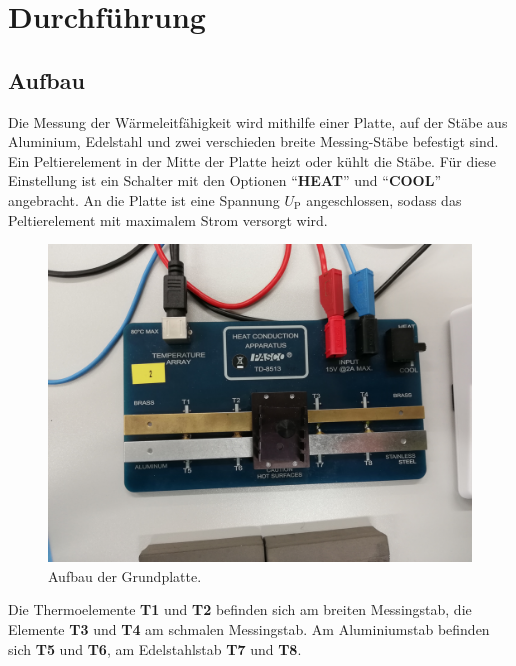 \section{Durchführung} \label{sec:durchführung}

\subsection{Aufbau}

    Die Messung der Wärmeleitfähigkeit wird mithilfe einer Platte,
    auf der Stäbe aus Aluminium, Edelstahl und zwei verschieden breite Messing-Stäbe befestigt sind.
    Ein Peltierelement in der Mitte der Platte heizt oder kühlt die Stäbe.
    Für diese Einstellung ist ein Schalter mit den Optionen \enquote{\textbf{HEAT}} und \enquote{\textbf{COOL}} angebracht.
    An die Platte ist eine Spannung $U_\text{P}$ angeschlossen, sodass das Peltierelement mit maximalem
    Strom versorgt wird.

    \begin{figure}[H]
       \centering
       \includegraphics[scale=0.075]{foto_aufbau.jpg}
       \caption{Aufbau der Grundplatte.}
       \label{fig:aufbau}
    \end{figure}

    Die Thermoelemente \textbf{T1} und \textbf{T2} befinden sich am breiten Messingstab,
    die Elemente \textbf{T3} und \textbf{T4} am schmalen Messingstab.
    Am Aluminiumstab befinden sich \textbf{T5} und \textbf{T6}, am Edelstahlstab \textbf{T7} und \textbf{T8}.


